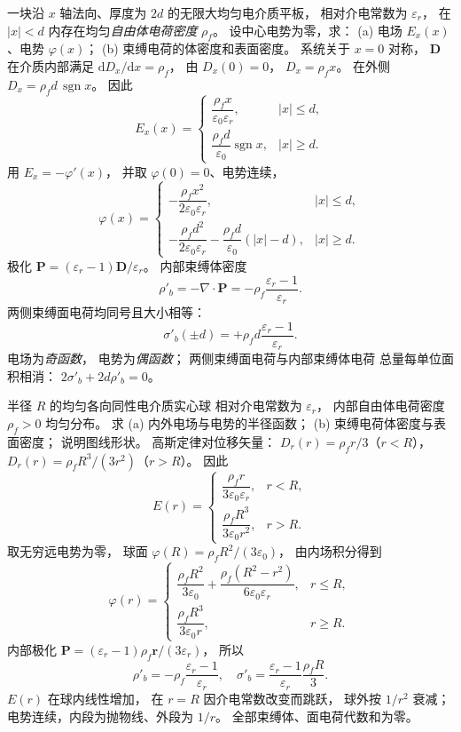一块沿 $x$ 轴法向、厚度为 $2d$
的无限大均匀电介质平板，
相对介电常数为 $\varepsilon_r$，
在 $|x|<d$ 内存在均匀\emph{自由体电荷密度}
$\rho_f$。
设中心电势为零，求：
(a) 电场 $E_x(x)$、电势 $\varphi(x)$；
(b) 束缚电荷的体密度和表面密度。
\exsolution
系统关于 $x=0$ 对称，
$\bm D$ 在介质内部满足
$\mathrm dD_x/\mathrm dx=\rho_f$，
由 $D_x(0)=0$，
$D_x=\rho_fx$。
在外侧
$D_x=\rho_fd\,\operatorname{sgn}x$。
因此
\[
\boxed{E_x(x)=
\begin{cases}
\dfrac{\rho_f x}{\varepsilon_0\varepsilon_r},
&|x|\le d,\\[2mm]
\dfrac{\rho_fd}{\varepsilon_0}\operatorname{sgn}x,
&|x|\ge d.
\end{cases}}
\]
用 $E_x=-\varphi'(x)$，
并取 $\varphi(0)=0$、电势连续，
\[
\boxed{\varphi(x)=
\begin{cases}
-\dfrac{\rho_fx^2}{2\varepsilon_0\varepsilon_r},
&|x|\le d,\\[2mm]
-\dfrac{\rho_fd^2}{2\varepsilon_0\varepsilon_r}
-\dfrac{\rho_fd}{\varepsilon_0}(|x|-d),
&|x|\ge d.
\end{cases}}
\]
极化
$\bm P=(\varepsilon_r-1)\bm D/\varepsilon_r$。
内部束缚体密度
\[
\boxed{\rho'_b=-\nabla\cdot\bm P
=-\rho_f\frac{\varepsilon_r-1}{\varepsilon_r}}.
\]
两侧束缚面电荷均同号且大小相等：
\[
\boxed{\sigma'_b(\pm d)=
+\rho_fd\frac{\varepsilon_r-1}{\varepsilon_r}}.
\]
\excheck 电场为\emph{奇函数}，
电势为\emph{偶函数}；
两侧束缚面电荷与内部束缚体电荷
总量每单位面积相消：
$2\sigma'_b+2d\rho'_b=0$。

半径 $R$ 的均匀各向同性电介质实心球
相对介电常数为 $\varepsilon_r$，
内部自由体电荷密度
$\rho_f>0$ 均匀分布。
求 (a) 内外电场与电势的半径函数；
(b) 束缚电荷体密度与表面密度；
说明图线形状。
\exsolution
高斯定律对位移矢量：
$D_r(r)=\rho_fr/3$（$r<R$），
$D_r(r)=\rho_fR^3/(3r^2)$（$r>R$）。
因此
\[
\boxed{E(r)=
\begin{cases}
\dfrac{\rho_fr}{3\varepsilon_0\varepsilon_r},
&r<R,\\[2mm]
\dfrac{\rho_fR^3}{3\varepsilon_0r^2},
&r>R.
\end{cases}}
\]
取无穷远电势为零，
球面
$\varphi(R)=\rho_fR^2/(3\varepsilon_0)$，
由内场积分得到
\[
\boxed{\varphi(r)=
\begin{cases}
\dfrac{\rho_fR^2}{3\varepsilon_0}
+\dfrac{\rho_f(R^2-r^2)}
{6\varepsilon_0\varepsilon_r},&r\le R,\\[2mm]
\dfrac{\rho_fR^3}{3\varepsilon_0r},&r\ge R.
\end{cases}}
\]
内部极化
$\bm P=(\varepsilon_r-1)\rho_f\bm r/(3\varepsilon_r)$，
所以
\[
\boxed{\rho'_b=
-\rho_f\frac{\varepsilon_r-1}{\varepsilon_r}},
\quad
\boxed{\sigma'_b=
\frac{\varepsilon_r-1}{\varepsilon_r}
\frac{\rho_fR}{3}}.
\]
\excheck $E(r)$ 在球内线性增加，
在 $r=R$ 因介电常数改变而跳跃，
球外按 $1/r^2$ 衰减；
电势连续，内段为抛物线、外段为 $1/r$。
全部束缚体、面电荷代数和为零。

